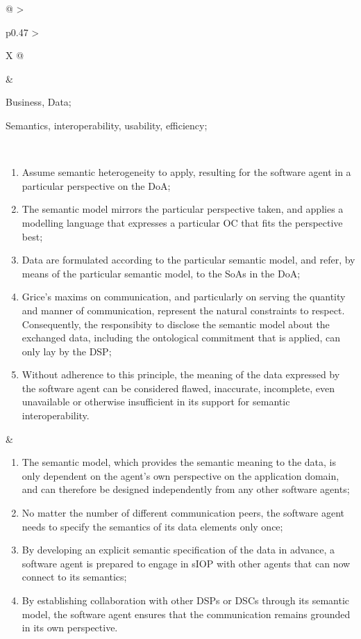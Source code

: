 \begin{xltabular}[l]{\linewidth}{@{} >{\small\raggedright\arraybackslash}p{0.47\linewidth} >{\small\raggedright\arraybackslash}X @{}}
\begin{mmdp}
\end{mmdp}
&
\begin{description}[labelwidth=3.7cm,leftmargin=3.7cm+1ex,nosep,topsep=2ex,labelsep=1ex,font=\bfseries]
  \item[Type of information:] Business, Data;
  \item[Quality attributes:] Semantics, interoperability, usability, efficiency;
\end{description} \\
\begin{enumerate}[left=6pt, nosep]
  \item Assume semantic heterogeneity to apply, resulting for the software agent in a particular perspective on the DoA;
  \item The semantic model mirrors the particular perspective taken, and applies a modelling language that expresses a particular OC that fits the perspective best; 
  \item Data are formulated according to the particular semantic model, and refer, by means of the particular semantic model, to the SoAs in the DoA;
  \item Grice’s maxims on communication, and particularly on serving the quantity and manner of communication, represent the natural constraints to respect. Consequently, the responsibity to disclose the semantic model about the exchanged data, including the ontological commitment that is applied, can only lay by the DSP;
  \item Without adherence to this principle, the meaning of the data expressed by the software agent can be considered flawed, inaccurate, incomplete, even unavailable or otherwise insufficient in its support for semantic interoperability.
\end{enumerate}
&
\begin{enumerate}[left=10pt, nosep]
  \item The semantic model, which provides the semantic meaning to the data, is only dependent on the agent’s own perspective on the application domain, and can therefore be designed independently from any other software agents;
  \item No matter the number of different communication peers, the software agent needs to specify the semantics of its data elements only once;
  \item By developing an explicit semantic specification of the data in advance, a software agent is prepared to engage in sIOP with other agents that can now connect to its semantics;
  \item By establishing collaboration with other DSPs or DSCs through its semantic model, the software agent ensures that the communication remains grounded in its own perspective.

\end{enumerate}
\end{xltabular}
